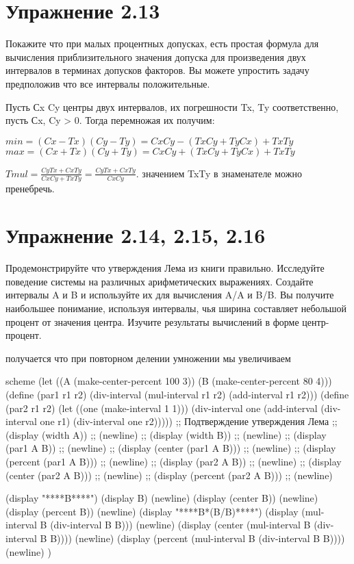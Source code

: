 \chapter{Упражнение 2.13}

Покажите что при малых процентных допусках, есть простая формула для вычисления приблизительного значения допуска для произведения двух интервалов в терминах допусков факторов. Вы можете упростить задачу предположив что все интервалы положительные.

Пусть Сx Cy центры двух интервалов, их погрешности Tx, Ty соответственно, пусть Сx, Cy > 0.
Тогда перемножая их получим:

$min = (Cx-Tx)(Cy-Ty) = CxCy - (TxCy + TyCx) + TxTy$
$max = (Cx+Tx)(Cy+Ty) = CxCy + (TxCy + TyCx) + TxTy$

$Tmul = \frac{CyTx + CxTy}{CxCy + TxTy}=\frac{CyTx + CxTy}{CxCy}$.
значением TxTy в знаменателе можно пренебречь.


\chapter{Упражнение 2.14, 2.15, 2.16}

Продемонстрируйте что утверждения Лема из книги правильно. Исследуйте поведение системы на различных арифметических выражениях. Создайте интервалы A и B и используйте их для вычисления A/A и B/B. Вы получите наибольшее понимание, используя интервалы, чья ширина составляет небольшой процент от значения центра. Изучите результаты вычислений в форме центр-процент.

получается что при повторном делении умножении мы увеличиваем %

\begin{codelisting}{scheme}
(let ((A (make-center-percent 100 3)) (B (make-center-percent 80 4)))
  (define (par1 r1 r2)
    (div-interval (mul-interval r1 r2)
                  (add-interval r1 r2)))
  (define (par2 r1 r2)
    (let ((one (make-interval 1 1)))
      (div-interval one
                    (add-interval (div-interval one r1)
                                  (div-interval one r2)))))
  ;; Подтверждение утверждения Лема
  ;; (display (width A))
  ;; (newline)
  ;; (display (width B))
  ;; (newline)
  ;; (display (par1 A B))
  ;; (newline)
  ;; (display (center (par1 A B)))
  ;; (newline)
  ;; (display (percent (par1 A B)))
  ;; (newline)
  ;; (display (par2 A B))
  ;; (newline)
  ;; (display (center (par2 A B)))
  ;; (newline)
  ;; (display (percent (par2 A B)))
  ;; (newline)

  (display "****B****")
  (display B)
  (newline)
  (display (center B))
  (newline)
  (display (percent B))
  (newline)
  (display "****B*(B/B)****")
  (display (mul-interval B (div-interval B B)))
  (newline)
  (display (center (mul-interval B (div-interval B B))))
  (newline)
  (display (percent (mul-interval B (div-interval B B))))
  (newline)
  )
\end{codelisting}

